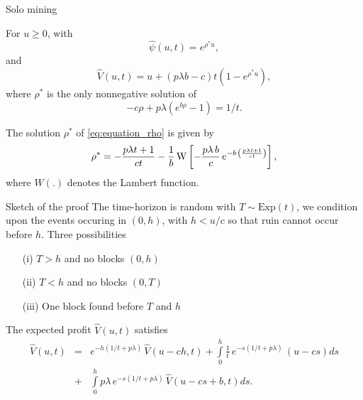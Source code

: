 \documentclass{beamer}
\begin{document}
\begin{frame}{Solo mining}
\scriptsize
\begin{tcolorbox}[enhanced,drop shadow, title=Theorem (profit and ruin when mining solo)]
For $u\geq0$, with 
\begin{equation*}
\widehat{\psi}(u,t) = e^{\rho^\ast u},
\end{equation*}
and 
\begin{equation*}
\widehat{V}(u,t) = u+(p\lambda b-c)t\left(1-e^{\rho^\ast u }\right),
\end{equation*}
where $\rho^\ast$ is the only nonnegative solution of
\begin{equation}\label{eq:equation_rho}
-c\rho + p\lambda(e^{b\rho}-1) = 1/t.
\end{equation}
\end{tcolorbox}
\begin{tcolorbox}[enhanced,drop shadow, title=Lambert function]
The solution $\rho^\ast$ of \eqref{eq:equation_rho} is given by 
\begin{equation*}
  \rho^{\ast}=-\frac{p \lambda t+1}{ct}
  -\frac{1}{b} \,{\rm W} \left[-\frac{p\lambda
    \,b}{c}\,{e^{-b\,\left(\frac{p \lambda t+1}{ct}\right)}}
  \right],
  \end{equation*}
  where $W(.)$ denotes the Lambert function.
\end{tcolorbox}
\end{frame}
\begin{frame}{Sketch of the proof}
\scriptsize
The time-horizon is random with $T\sim\text{Exp}(t)$, we condition upon the events occuring in $(0,h)$, with $h<u/c$ so that ruin cannot occur before $h$. Three possibilities
\begin{itemize}
  \item[(i)] $T>h$ and no blocks $(0,h)$
  \item[(ii)] $T<h$ and no blocks $(0,T)$
  \item[(iii)] One block found before $T$ and $h$
\end{itemize}
The expected profit $\widehat{V}(u,t)$ satisfies
\begin{eqnarray*}
  \widehat{V}(u,t)& =&e^{-h(1/t + p\lambda)}\,\widehat{V}(u-ch,t)+\int\limits_0^h\frac1t\, e^{-s(1/t + p\lambda)}\,(u-cs)ds\\
  &+&\int\limits_0^h p\lambda\, e^{-s(1/t + p\lambda)}\,\widehat{V}(u-cs+b,t)ds.
  \end{eqnarray*}
  \end{frame}
\end{document}

